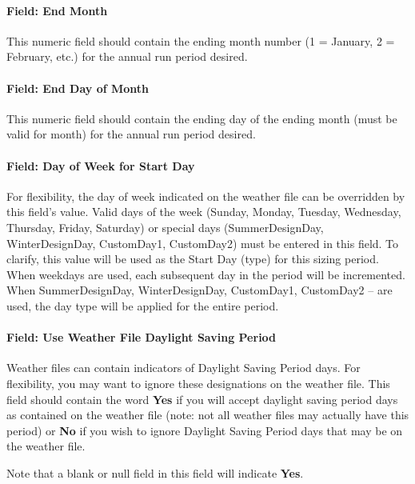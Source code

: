 \paragraph{Field: End Month}\label{field-end-month}

This numeric field should contain the ending month number (1 = January, 2 = February, etc.) for the annual run period desired.

\paragraph{Field: End Day of Month}\label{field-end-day-of-month}

This numeric field should contain the ending day of the ending month (must be valid for month) for the annual run period desired.

\paragraph{Field: Day of Week for Start Day}\label{field-day-of-week-for-start-day}

For flexibility, the day of week indicated on the weather file can be overridden by this field's value. Valid days of the week (Sunday, Monday, Tuesday, Wednesday, Thursday, Friday, Saturday) or special days (SummerDesignDay, WinterDesignDay, CustomDay1, CustomDay2) must be entered in this field. To clarify, this value will be used as the Start Day (type) for this sizing period. When weekdays are used, each subsequent day in the period will be incremented. When SummerDesignDay, WinterDesignDay, CustomDay1, CustomDay2 -- are used, the day type will be applied for the entire period.

\paragraph{Field: Use Weather File Daylight Saving Period}\label{field-use-weather-file-daylight-saving-period}

Weather files can contain indicators of Daylight Saving Period days. For flexibility, you may want to ignore these designations on the weather file. This field should contain the word \textbf{Yes} if you will accept daylight saving period days as contained on the weather file (note: not all weather files may actually have this period) or \textbf{No} if you wish to ignore Daylight Saving Period days that may be on the weather file.

Note that a blank or null field in this field will indicate \textbf{Yes}.


